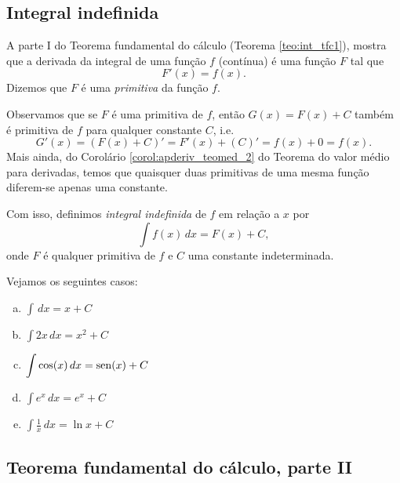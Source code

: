 \subsection{Integral indefinida}

A parte I do Teorema fundamental do cálculo (Teorema \ref{teo:int_tfc1}), mostra que a derivada da integral de uma função $f$ (contínua) é uma função $F$ tal que
\begin{equation}
  F'(x) = f(x).
\end{equation}
Dizemos que $F$ é uma \emph{primitiva} da função $f$.

Observamos que se $F$ é uma primitiva de $f$, então $G(x) = F(x) + C$ também é primitiva de $f$ para qualquer constante $C$, i.e.
\begin{equation}
  G'(x) = (F(x) + C)' = F'(x) + (C)' = f(x) + 0 = f(x).
\end{equation}
Mais ainda, do Corolário \ref{corol:apderiv_teomed_2} do Teorema do valor médio para derivadas, temos que quaisquer duas primitivas de uma mesma função diferem-se apenas uma constante.

Com isso, definimos \emph{integral indefinida} de $f$ em relação a $x$ por
\begin{equation}
  \int f(x)\,dx = F(x) + C,
\end{equation}
onde $F$ é qualquer primitiva de $f$ e $C$ uma constante indeterminada.

\begin{ex}
  Vejamos os seguintes casos:
  \begin{enumerate}[a)]
  \item $\displaystyle \int \,dx = x + C$
  \item $\displaystyle \int 2x\,dx = x^2 + C$
  \item $\displaystyle \int \cos(x)\,dx = \operatorname{sen}(x) + C$
  \item $\displaystyle \int e^x\,dx = e^x + C$
  \item $\displaystyle \int \frac{1}{x}\,dx = \ln x + C$
  \end{enumerate}
\end{ex}

\subsection{Teorema fundamental do cálculo, parte II}

